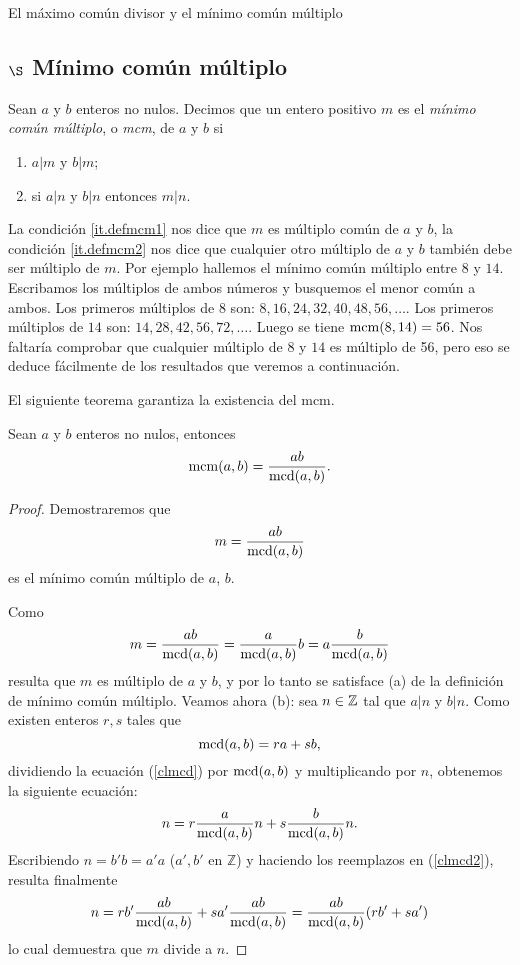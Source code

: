 \begin{section}{El máximo común divisor y el mínimo común múltiplo}
\subsection*{$\S$ Mínimo común múltiplo}


\begin{definicion}\label{def-mcm}
Sean $a$ y $b$  enteros no nulos. Decimos que un entero positivo $m$ es el \textit{mínimo común múltiplo}, o \textit{mcm}, de $a$ y $b$ si
\begin{enumerate}[label=\textit{\alph*)}]
\item\label{it.defmcm1} $ a|m$ y $b|m$;
\item\label{it.defmcm2} si $ a|n $ y $b|n$ entonces $ m|n$.
\end{enumerate}
\end{definicion}
La condición \ref{it.defmcm1} nos dice que $m$ es múl\-ti\-plo común de $a$ y $b$, la condición \ref{it.defmcm2} nos dice que cualquier otro múltiplo de $a$ y $b$ también debe ser múltiplo de $m$. Por ejemplo hallemos el mínimo común múltiplo entre $8$ y $14$. Escribamos los múl\-ti\-plos de ambos números y busquemos el menor común a ambos. Los primeros múltiplos de $8$ son: $8,16,24,32,40,48,56,\ldots$. Los primeros múltiplos de $14$ son: $14,28,42,56,72,\ldots$. Luego se tiene $\operatorname{mcm}(8,14)=56$. Nos faltaría  comprobar que cualquier múltiplo de $8$ y $14$ es múltiplo de 56, pero eso se deduce fácilmente de los resultados que veremos a continuación.

El siguiente teorema garantiza la existencia del mcm.

\begin{teorema}\label{t1.7.2} Sean $a$ y $b$ enteros no nulos, entonces
$$
\operatorname{mcm}(a,b)=\frac{a b}{\operatorname{mcd}(a,b)}.
$$
\end{teorema}
\begin{proof} Demostraremos que
$$
m=\frac{a b}{\operatorname{mcd}(a,b)}
$$
es el mínimo común múltiplo de $a$, $b$.

Como
$$
m=\frac{a b}{\operatorname{mcd}(a,b)}=\frac{a}{\operatorname{mcd}(a,b)} b
=a\frac{b}{\operatorname{mcd}(a,b)}
$$
resulta que $m$ es múltiplo de $a$ y $b$, y por lo tanto se satisface (a) de la definición de mínimo común múltiplo. Veamos ahora (b): sea $n \in {\mathbb Z}$ tal que  $a|n$ y $b|n$. Como  existen enteros $r,s$ tales que 
\begin{equation}\label{clmcd}
\operatorname{mcd}(a,b)=ra+sb,
\end{equation} 
dividiendo la ecuación (\ref{clmcd}) por $\operatorname{mcd}(a,b)$ y multiplicando por $n$, obtenemos la si\-guien\-te ecuación:
\begin{equation}\label{clmcd2}
n= r\frac{a}{\operatorname{mcd}(a,b)}n + s\frac{b}{\operatorname{mcd}(a,b)}n.
\end{equation} 
Escribiendo $n=b'b=a'a$ ($a',b'$ en $\mathbb Z$) y haciendo los reemplazos en (\ref{clmcd2}), resulta
finalmente
\begin{equation*}
n= rb'\frac{a b}{\operatorname{mcd}(a,b)}+sa'\frac{a b}{\operatorname{mcd}(a,b)}= \frac{a
b}{\operatorname{mcd}(a,b)}(rb'+sa')
\end{equation*}
lo cual demuestra que $m$ divide a $n$.
\end{proof}


\end{section}
